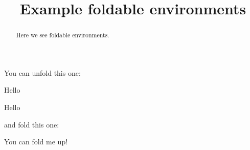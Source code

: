 \documentclass{ximera}
\title{Example foldable environments}
\begin{document}
\begin{abstract}
  Here we see foldable environments.
\end{abstract}
\maketitle

You can unfold this one:

\begin{unfoldable}
  Hello
\end{unfoldable}

\begin{expandable}
  Hello
\end{expandable}



and fold this one:

\begin{foldable}
  You can fold me up!
\end{foldable}
\end{document}
